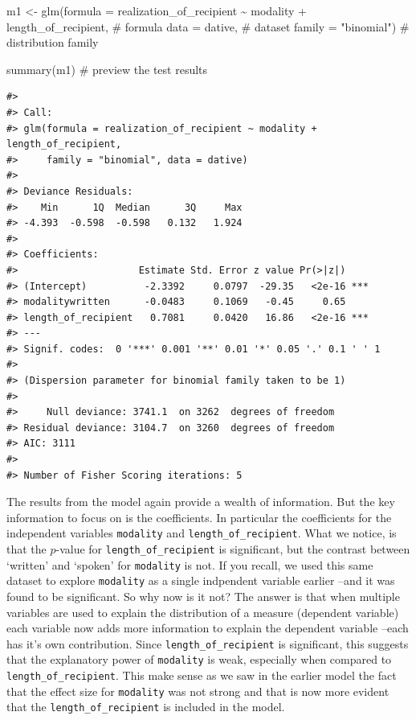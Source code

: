 \documentclass[
  letterpaper,
]{latex/krantz}
\newenvironment{Shaded}{\begin{snugshade}}{\end{snugshade}}
\newcommand{\AttributeTok}[1]{\textcolor[rgb]{0.40,0.45,0.13}{#1}}
\newcommand{\CommentTok}[1]{\textcolor[rgb]{0.37,0.37,0.37}{#1}}
\newcommand{\FunctionTok}[1]{\textcolor[rgb]{0.28,0.35,0.67}{#1}}
\newcommand{\NormalTok}[1]{\textcolor[rgb]{0.00,0.23,0.31}{#1}}
\newcommand{\OtherTok}[1]{\textcolor[rgb]{0.00,0.23,0.31}{#1}}
\newcommand{\SpecialCharTok}[1]{\textcolor[rgb]{0.37,0.37,0.37}{#1}}
\newcommand{\StringTok}[1]{\textcolor[rgb]{0.13,0.47,0.30}{#1}}
\begin{document}
\begin{Shaded}
\begin{Highlighting}[]
\NormalTok{m1 }\OtherTok{\textless{}{-}} \FunctionTok{glm}\NormalTok{(}\AttributeTok{formula =}\NormalTok{ realization\_of\_recipient }\SpecialCharTok{\textasciitilde{}}\NormalTok{ modality }\SpecialCharTok{+}\NormalTok{ length\_of\_recipient, }\CommentTok{\# formula}
          \AttributeTok{data =}\NormalTok{ dative, }\CommentTok{\# dataset}
          \AttributeTok{family =} \StringTok{"binomial"}\NormalTok{) }\CommentTok{\# distribution family}

\FunctionTok{summary}\NormalTok{(m1) }\CommentTok{\# preview the test results}
\end{Highlighting}
\end{Shaded}

\begin{verbatim}
#> 
#> Call:
#> glm(formula = realization_of_recipient ~ modality + length_of_recipient, 
#>     family = "binomial", data = dative)
#> 
#> Deviance Residuals: 
#>    Min      1Q  Median      3Q     Max  
#> -4.393  -0.598  -0.598   0.132   1.924  
#> 
#> Coefficients:
#>                     Estimate Std. Error z value Pr(>|z|)    
#> (Intercept)          -2.3392     0.0797  -29.35   <2e-16 ***
#> modalitywritten      -0.0483     0.1069   -0.45     0.65    
#> length_of_recipient   0.7081     0.0420   16.86   <2e-16 ***
#> ---
#> Signif. codes:  0 '***' 0.001 '**' 0.01 '*' 0.05 '.' 0.1 ' ' 1
#> 
#> (Dispersion parameter for binomial family taken to be 1)
#> 
#>     Null deviance: 3741.1  on 3262  degrees of freedom
#> Residual deviance: 3104.7  on 3260  degrees of freedom
#> AIC: 3111
#> 
#> Number of Fisher Scoring iterations: 5
\end{verbatim}

The results from the model again provide a wealth of information. But
the key information to focus on is the coefficients. In particular the
coefficients for the independent variables \texttt{modality} and
\texttt{length\_of\_recipient}. What we notice, is that the \(p\)-value
for \texttt{length\_of\_recipient} is significant, but the contrast
between `written' and `spoken' for \texttt{modality} is not. If you
recall, we used this same dataset to explore \texttt{modality} as a
single indpendent variable earlier --and it was found to be significant.
So why now is it not? The answer is that when multiple variables are
used to explain the distribution of a measure (dependent variable) each
variable now adds more information to explain the dependent variable
--each has it's own contribution. Since \texttt{length\_of\_recipient}
is significant, this suggests that the explanatory power of
\texttt{modality} is weak, especially when compared to
\texttt{length\_of\_recipient}. This make sense as we saw in the earlier
model the fact that the effect size for \texttt{modality} was not strong
and that is now more evident that the \texttt{length\_of\_recipient} is
included in the model.
\end{document}

